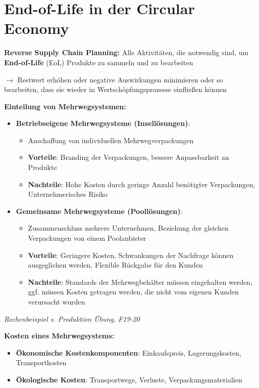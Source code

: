 \section{End-of-Life in der Circular Economy}

\textbf{Reverse Supply Chain Planning:} Alle Aktivitäten, die notwendig sind, um
\textbf{End-of-Life} (EoL) Produkte zu sammeln und zu bearbeiten 

$\rightarrow$ Restwert erhöhen oder negative Auswirkungen minimieren oder so bearbeiten, dass sie wieder in Wertschöpfungsprozesse einfließen können

\textbf{Einteilung von Mehrwegsystemen:}
\begin{itemize}
	\item \textbf{Betriebseigene Mehrwegsysteme (Insellösungen)}:
	\begin{itemize}
		\item Anschaffung von individuellen Mehrwegverpackungen
		\item \textbf{Vorteile}: Branding der Verpackungen, bessere Anpassbarkeit an Produkte
		\item \textbf{Nachteile}: Hohe Kosten durch geringe Anzahl benötigter Verpackungen, Unternehmerisches Risiko
	\end{itemize}
	\item \textbf{Gemeinsame Mehrwegsysteme (Poollösungen)}:
	\begin{itemize}
		\item Zusammenschluss mehrere Unternehmen, Beziehung der gleichen Verpackungen von einem Poolanbieter
		\item \textbf{Vorteile}: Geringere Kosten, Schwankungen der Nachfrage können ausgeglichen werden, Flexible Rückgabe für den Kunden
		\item \textbf{Nachteile}: Standards der Mehrwegbehälter müssen eingehalten werden, ggf. müssen Kosten getragen werden, die nicht vom eigenen Kunden verursacht wurden
	\end{itemize}
\end{itemize}

\textit{Rechenbeispiel s. Produktion Übung, F19-20}

\pagebreak
\textbf{Kosten eines Mehrwegsystems:}
\begin{itemize}
	\item \textbf{Ökonomische Kostenkomponenten}: Einkaufspreis, Lagerungskosten, Transportkosten
	\item \textbf{Ökologische Kosten}: Transportwege, Verluste, Verpackungsmaterialien
\end{itemize}